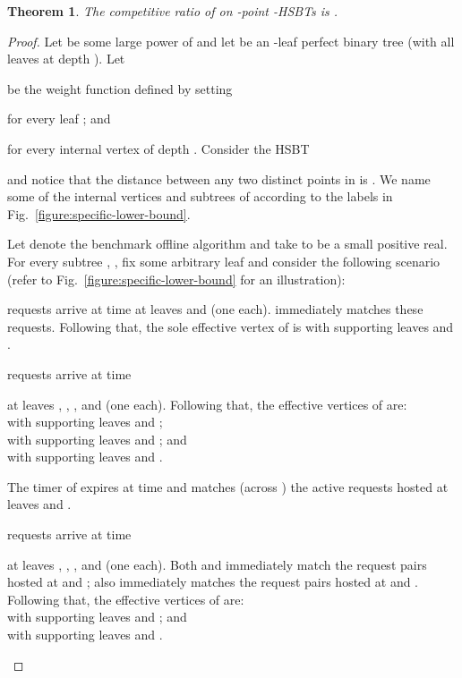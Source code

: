 \documentclass[11pt]{article}
\newtheorem{theorem}{Theorem}[section]
\theoremstyle{definition}
\theoremstyle{plain}
\newtheorem{theorem}{Theorem}
\theoremstyle{definition}
\theoremstyle{plain}
\newtheorem{theorem}{Theorem}[section]
\theoremstyle{definition}
\theoremstyle{plain}
\newenvironment{DenseItemize}[0]
{\begin{list}{\labelitemi}{\usecounter{enumi}
\itemsep 0pt \parsep 0pt \leftmargin 5mm \labelwidth 5mm \parskip 0pt \topsep
0pt}}
{\end{list}}
\newcommand{\Fig}{Fig.}
\begin{document}
\begin{theorem} \label{theorem:specific-lower-bound}
The competitive ratio of  on -point
-HSBTs
is .
\end{theorem}
\begin{proof}
Let  be some large power of  and let  be an -leaf perfect binary
tree (with all leaves at depth ).
Let

be the weight function defined by setting

for every leaf ; and

for every internal vertex  of depth .
Consider the HSBT

and notice that the distance between any two distinct points in 
is .
We name some of the internal vertices and subtrees of  according to the
labels in \Fig{}~\ref{figure:specific-lower-bound}.

Let  denote the benchmark offline algorithm and take 
to be a small positive real.
For every subtree , , fix some arbitrary leaf 
and consider the following scenario  (refer to
\Fig{}~\ref{figure:specific-lower-bound} for an illustration):

\begin{DenseItemize}

\item
 requests arrive at time  at leaves  and  (one each).
 immediately matches these requests.
Following that, the sole effective vertex of  is  with supporting
leaves  and .

\item
 requests arrive at time

at leaves
, , , and  (one each).
Following that, the effective vertices of  are: \\
 with supporting leaves  and ; \\
 with supporting leaves  and ; and \\
 with supporting leaves  and .

\item
The timer of  expires at time  and  matches (across
) the active requests hosted at leaves  and .

\item
 requests arrive at time

at leaves
, , , and  (one each).
Both  and  immediately match the request pairs hosted at
 and ;
 also immediately matches the request pairs hosted at 
and .
Following that, the effective vertices of  are: \\
 with supporting leaves  and ; and \\
 with supporting leaves  and .


\end{DenseItemize}
\end{proof}
\end{document}
